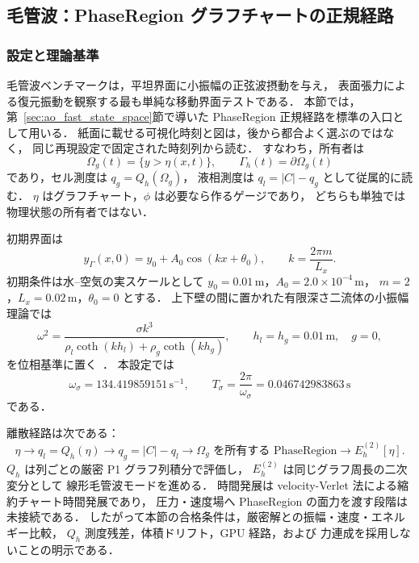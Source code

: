 \subsection{毛管波：PhaseRegion グラフチャートの正規経路}
\label{sec:val_capillary}

\subsubsection{設定と理論基準}

毛管波ベンチマークは，平坦界面に小振幅の正弦波摂動を与え，
表面張力による復元振動を観察する最も単純な移動界面テストである．
本節では，第~\ref{sec:ao_fast_state_space}節で導いた
PhaseRegion 正規経路を標準の入口として用いる．
紙面に載せる可視化時刻と図は，後から都合よく選ぶのではなく，
同じ再現設定で固定された時刻列から読む．
すなわち，所有者は
\[
  \Omega_g(t)=\{y>\eta(x,t)\},
  \qquad
  \Gamma_h(t)=\partial\Omega_g(t)
\]
であり，セル測度は $q_g=Q_h(\Omega_g)$，
液相測度は $q_l=|C|-q_g$ として従属的に読む．
$\eta$ はグラフチャート，$\phi$ は必要なら作るゲージであり，
どちらも単独では物理状態の所有者ではない．

初期界面は
\begin{equation}
  y_\Gamma(x,0)=y_0 + A_0\cos(kx+\theta_0),
  \qquad
  k=\frac{2\pi m}{L_x}.
  \label{eq:capillary_wave_initial}
\end{equation}
初期条件は水--空気の実スケールとして
$y_0=0.01\,\mathrm{m}$，$A_0=2.0\times10^{-4}\,\mathrm{m}$，
$m=2$，$L_x=0.02\,\mathrm{m}$，$\theta_0=0$ とする．
上下壁の間に置かれた有限深さ二流体の小振幅理論では
\begin{equation}
  \omega^2
  = \frac{\sigma k^3}
         {\rho_l\coth(kh_l)+\rho_g\coth(kh_g)},
  \qquad
  h_l=h_g=0.01\,\mathrm{m},\quad g=0,
  \label{eq:flat_capillary_dispersion}
\end{equation}
を位相基準に置く~\cite{Prosperetti1981}．
本設定では
\[
  \omega_\sigma
  =134.419859151\,\mathrm{s^{-1}},\qquad
  T_\sigma=\frac{2\pi}{\omega_\sigma}=0.046742983863\,\mathrm{s}
\]
である．

離散経路は次である：
\[
  \eta
  \longrightarrow
  q_l=Q_h(\eta)
  \longrightarrow
  q_g=|C|-q_l
  \longrightarrow
  \Omega_g\text{ を所有する PhaseRegion}
  \longrightarrow
  E_h^{(2)}[\eta].
\]
$Q_h$ は列ごとの厳密 P1 グラフ列積分で評価し，
$E_h^{(2)}$ は同じグラフ周長の二次変分として
線形毛管波モードを進める．
時間発展は velocity-Verlet 法による縮約チャート時間発展であり，
圧力・速度場へ PhaseRegion の面力を渡す段階は未接続である．
したがって本節の合格条件は，厳密解との振幅・速度・エネルギー比較，
$Q_h$ 測度残差，体積ドリフト，GPU 経路，および
力連成を採用しないことの明示である．

